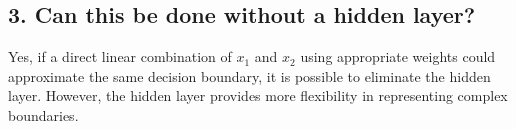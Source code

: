 \documentclass[12pt]{article}
\begin{document}
\subsection*{3. Can this be done without a hidden layer?}

Yes, if a direct linear combination of \( x_1 \) and \( x_2 \) using appropriate weights could approximate the same decision boundary, it is possible to eliminate the hidden layer. However, the hidden layer provides more flexibility in representing complex boundaries.
\end{document}
